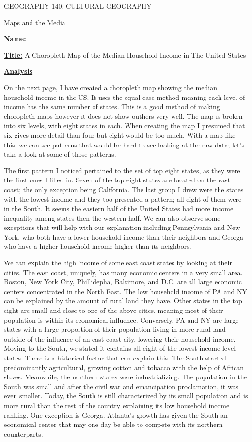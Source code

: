 \documentclass{article}
\author{Ryan Bruno}
\date{\today}
\renewcommand{\maketitle}{

\begin{center}
\setlength{\parskip}{0em}
GEOGRAPHY 140:  CULTURAL GEOGRAPHY

Maps and the Media
\end{center}
\textbf{\underline{Name:}}
\theauthor

\textbf{\underline{Title:}}
A Choropleth Map of the Median Household Income in The United States
}
\begin{document}
\maketitle

\textbf{\underline{Analysis}}

\setlength{\parindent}{8ex}
On the next page, I have created a choropleth map showing the median household income in the US. It uses the equal case method meaning each level of income has the same number of states. This is a good method of making choropleth maps however it does not show outliers very well. The map is broken into six levels, with eight states in each. When creating the map I presumed that six gives more detail than four but eight would be too much. With a map like this, we can see patterns that would be hard to see looking at the raw data; let's take a look at some of those patterns.

The first pattern I noticed pertained to the set of top eight states, as they were the first ones I filled in. Seven of the top eight states are located on the east coast; the only exception being California. The last group I drew were the states with the lowest income and they too presented a pattern; all eight of them were in the South. It seems the eastern half of the United States had more income inequality among states then the western half. We can also observe some exceptions that will help with our explanation including Pennsylvania and New York, who both have a lower household income than their neighbors and Georga who have a higher household income higher than its neighbors.

We can explain the high income of some east coast states by looking at their cities. The east coast, uniquely, has many economic centers in a very small area. Boston, New York City, Phillidepha, Baltimore, and D.C. are all large economic centers concentrated in the North East. The low household income of PA and NY can be explained by the amount of rural land they have. Other states in the top eight are small and close to one of the above cities, meaning most of their population is within its economical influence. Conversely, PA and NY are large states with a large proportion of their population living in more rural land outside of the influence of an east coast city, lowering their household income. Moving to the South, we stated it contains all eight of the lowest income level states. There is a historical factor that can explain this. The South started predominantly agricultural, growing cotton and tobacco with the help of African slaves. Meanwhile, the northern states were industrializing. The population in the South was small and after the civil war and emancipation proclamation, it was even smaller. Today, the South is still characterized by its small population and is more rural than the rest of the country explaining its low household income ranking. One exception is Georga. Atlanta's growth has given the South an economical center that may one day be able to compete with its northern counterparts.
\end{document}
